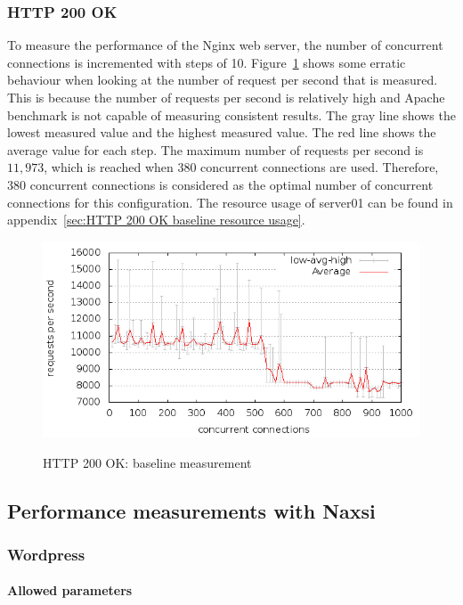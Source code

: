 \documentclass[Experiments]{subfiles}
\begin{document}
\subsubsection{HTTP 200 OK}
To measure the performance of the Nginx web server, the number of concurrent connections is incremented with steps of 10. Figure~\ref{fig:HTTP 200 OK: requests per second} shows some erratic behaviour when looking at the number of request per second that is measured. This is because the number of requests per second is relatively high and Apache benchmark is not capable of measuring consistent results. The gray line shows the lowest measured value and the highest measured value. The red line shows the average value for each step. The maximum number of requests per second is $11,973$, which is reached when $380$ concurrent connections are used. Therefore, 380 concurrent connections is considered as the optimal number of concurrent connections for this configuration. The resource usage of server01 can be found in appendix~\ref{sec:HTTP 200 OK baseline resource usage}.

\begin{figure}[H]
\caption{HTTP 200 OK: baseline measurement}
\centering
\includegraphics[scale=0.55] {images/results/baseline_200/output.png}
\label{fig:HTTP 200 OK: requests per second}
\end{figure}

\subsection{Performance measurements with Naxsi}

\subsubsection{Wordpress}

\paragraph*{Allowed parameters}
\end{document}
